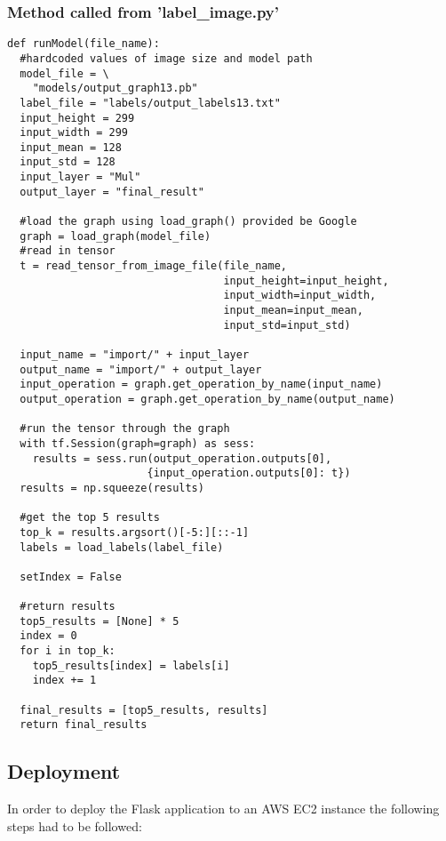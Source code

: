 \tocless\subsubsection{Method called from 'label\_image.py'}
\begin{lstlisting}[style=Python]
def runModel(file_name):
  #hardcoded values of image size and model path
  model_file = \
    "models/output_graph13.pb"
  label_file = "labels/output_labels13.txt"
  input_height = 299
  input_width = 299
  input_mean = 128
  input_std = 128
  input_layer = "Mul"
  output_layer = "final_result"

  #load the graph using load_graph() provided be Google
  graph = load_graph(model_file)
  #read in tensor
  t = read_tensor_from_image_file(file_name,
                                  input_height=input_height,
                                  input_width=input_width,
                                  input_mean=input_mean,
                                  input_std=input_std)

  input_name = "import/" + input_layer
  output_name = "import/" + output_layer
  input_operation = graph.get_operation_by_name(input_name)
  output_operation = graph.get_operation_by_name(output_name)

  #run the tensor through the graph
  with tf.Session(graph=graph) as sess:
    results = sess.run(output_operation.outputs[0],
                      {input_operation.outputs[0]: t})
  results = np.squeeze(results)

  #get the top 5 results
  top_k = results.argsort()[-5:][::-1]
  labels = load_labels(label_file)

  setIndex = False

  #return results
  top5_results = [None] * 5
  index = 0
  for i in top_k:
    top5_results[index] = labels[i]
    index += 1

  final_results = [top5_results, results]
  return final_results
\end{lstlisting}

\tocless\subsection{Deployment}
In order to deploy the Flask application to an AWS EC2 instance the following steps had to be followed:

